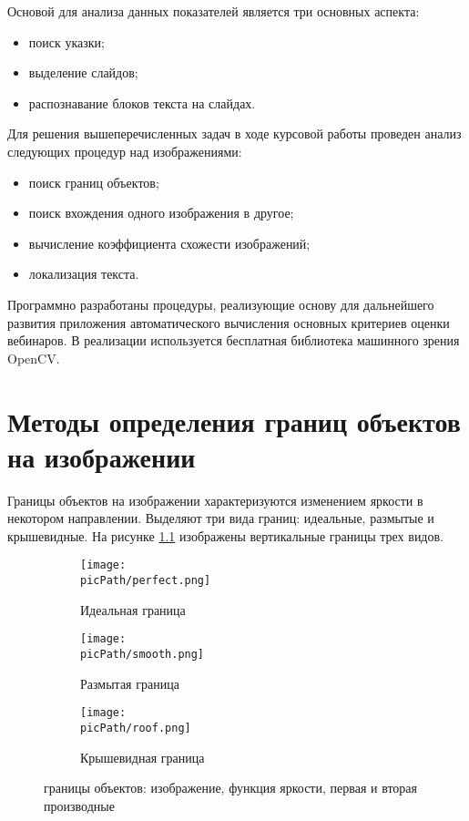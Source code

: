 \documentclass[oneside,final,14pt]{extreport}
\newcommand{\picPath}{pictures}
\begin{document}
Основой для анализа данных показателей является три основных аспекта:
\begin{itemize}
\item поиск указки;
\item выделение слайдов;
\item распознавание блоков текста на слайдах.
\end{itemize} 

Для решения вышеперечисленных задач в ходе курсовой работы проведен анализ следующих процедур над изображениями:

\begin{itemize}
\item поиск границ объектов;
\item поиск вхождения одного изображения в другое;
\item вычисление коэффициента схожести изображений;
\item локализация текста.
\end{itemize}

Программно разработаны процедуры, реализующие основу для дальнейшего развития приложения автоматического вычисления основных критериев оценки вебинаров. В реализации используется бесплатная библиотека машинного зрения OpenCV. 

\chapter{Методы определения границ объектов на изображении}
Границы объектов на изображении характеризуются изменением яркости в некотором направлении. Выделяют три вида границ: идеальные,  размытые  и крышевидные. На рисунке \ref{fig:contours}  изображены вертикальные границы трех видов.

\begin{figure}[H]
  \centering
  \begin{subfigure}[b]{0.4\linewidth}
    \texttt{[image: \\picPath/perfect.png]}
    \caption{ Идеальная граница}
  \end{subfigure}
  \begin{subfigure}[b]{0.4\linewidth}
    \texttt{[image: \\picPath/smooth.png]}
    \caption{Размытая граница}
  \end{subfigure}
  \begin{subfigure}[b]{0.4\linewidth}
    \texttt{[image: \\picPath/roof.png]}
    \caption{Крышевидная граница}
  \end{subfigure}
  \caption{границы объектов: изображение, функция яркости, первая и вторая производные}
  \label{fig:contours}
\end{figure}
\end{document}
